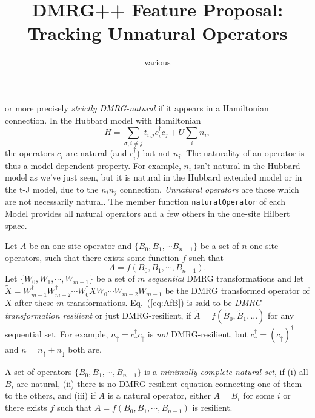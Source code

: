 \documentclass{article}
\begin{document}
\title{DMRG++ Feature Proposal:\\
Tracking Unnatural Operators}
\author{various}
\maketitle

 or
more precisely \emph{strictly DMRG-natural}
if it appears in a Hamiltonian connection. In the Hubbard model
with Hamiltonian
\begin{equation}
H=\sum_{\sigma, i\neq j}t_{i,j} c^\dagger_i c_j + U\sum_i n_i,
\end{equation}
the operators $c_i$ are natural (and $c^\dagger_i$) but not $n_i$.
The naturality of an operator is thus a model-dependent property.
For example, $n_i$ isn't natural in the Hubbard model as we've just
seen, but it is natural
in the Hubbard extended model or in the t-J model, due to the $n_i n_j$ connection.
\emph{Unnatural operators} are those which are not necessarily natural.
 The member function \texttt{naturalOperator}
of each Model provides all natural operators and a few others
in the one-site Hilbert space.

Let $A$ be an one-site operator and $\{B_0, B_1, \cdots B_{n-1}\}$ be a set
of $n$ one-site operators, such that there exists some function $f$ such that
\begin{equation}
A = f(B_0, B_1, \cdots, B_{n-1}).
\label{eq:AfB}
\end{equation}
Let $\{W_0, W_1, \cdots, W_{m-1}\}$ be a set of $m$ \emph{sequential} DMRG 
 transformations and let 
 $\tilde{X} = 
 W^\dagger_{m-1} W^\dagger_{m-2}\cdots W^\dagger_0 X W_0\cdots W_{m-2} W_{m-1}$ be
 the DMRG transformed operator of $X$ after these $m$ transformations.
Eq.~(\ref{eq:AfB}) is said to be \emph{DMRG-transformation resilient}
or just DMRG-resilient, if
$\tilde{A} =  f(\tilde{B}_0, \tilde{B}_1, ...)$ for any sequential set.
For example, $n_\uparrow=c^\dagger_\uparrow c_\uparrow$ is \emph{not} DMRG-resilient,
but  $c^\dagger_\uparrow = (c_\uparrow)^\dagger$ and
$n=n_\uparrow + n_\downarrow$ both are.

A set of operators $\{B_0, B_1, \cdots, B_{n-1}\}$ is a \emph{minimally complete
natural set}, if (i) all $B_i$ are natural, (ii) there is no DMRG-resilient
equation connecting one of them to the others, and (iii) if $A$ is a 
natural operator, either $A=B_i$ for some $i$ or there exists $f$ such that
$A = f(B_0, B_1, \cdots, B_{n-1})$ is resilient.
\end{document}
